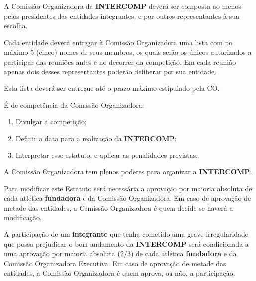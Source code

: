 \begin{article}
	A Comissão Organizadora da \textbf{INTERCOMP} deverá ser composta ao menos pelos presidentes das entidades integrantes, e por outros representantes à sua escolha.

	\begin{xparagraph}
		Cada entidade deverá entregar à Comissão Organizadora uma lista com no máximo 5 (cinco) nomes de seus membros, os quais serão os únicos autorizados a participar das reuniões antes e no decorrer da competição. Em cada reunião apenas dois desses representantes poderão deliberar por sua entidade.
	\end{xparagraph}

	\begin{xparagraph}
		Esta lista deverá ser entregue até o prazo máximo estipulado pela CO.
	\end{xparagraph}

	\begin{xparagraph}
		É de competência da Comissão Organizadora:
		\begin{enumerate}[noitemsep]
			\item Divulgar a competição;
			\item Definir a data para a realização da \textbf{INTERCOMP};
			\item Interpretar esse estatuto, e aplicar as penalidades previstas;
		\end{enumerate}
	\end{xparagraph}
\end{article}

\begin{article}
	A Comissão Organizadora tem plenos poderes para organizar a \textbf{INTERCOMP}.

	\begin{xparagraph}
		Para modificar este Estatuto será necessária a aprovação por maioria absoluta de cada atlética \textbf{fundadora} e da Comissão Organizadora. Em caso de aprovação de metade das entidades, a Comissão Organizadora é quem decide se haverá a modificação.
	\end{xparagraph}

	\begin{xparagraph}
		A participação de um \textbf{integrante} que tenha cometido uma grave irregularidade que possa prejudicar o bom andamento da \textbf{INTERCOMP} será condicionada a uma aprovação por maioria absoluta (2/3) de cada atlética \textbf{fundadora} e da Comissão Organizadora Executiva. Em caso de aprovação de metade das entidades, a Comissão Organizadora é quem aprova, ou não, a participação.
	\end{xparagraph}
\end{article}

